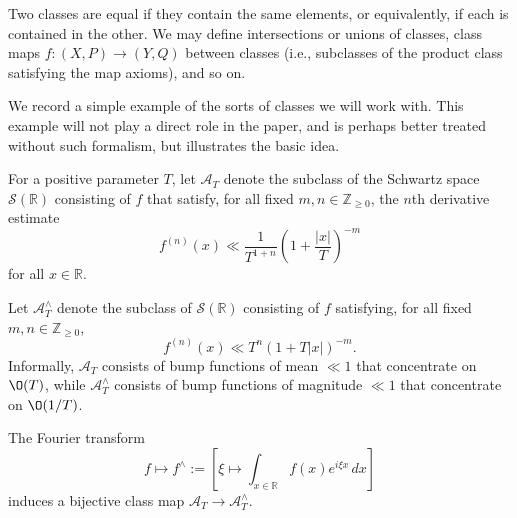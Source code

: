 Two classes are equal if they contain the same elements, or equivalently, if each is contained in the other.  We may define intersections or unions of classes, class maps $f : (X,P) \rightarrow (Y,Q)$ between classes (i.e., subclasses of the product class satisfying the map axioms), and so on.

We record a simple example of the sorts of classes we will work with.  This example will not play a direct role in the paper, and is perhaps better treated without such formalism, but illustrates the basic idea.
\begin{example}\label{exa:positive-parameter-t-scaling}
  For a positive parameter $T$, let $\mathcal{A}_T$ denote the subclass of the Schwartz space $\mathcal{S}(\mathbb{R})$ consisting of $f$ that satisfy, for all fixed $m,n \in \mathbb{Z}_{\geq 0}$, the $n$th derivative estimate
  \begin{equation*}
    f^{(n)}(x) \ll \frac{1}{T^{1+n}} \left(1 + \frac{|x|}{T}\right)^{-m}
  \end{equation*}
  for all $x \in \mathbb{R}$.

  Let $\mathcal{A}_T^\wedge$ denote the subclass of $\mathcal{S}(\mathbb{R})$ consisting of $f$ satisfying, for all fixed $m,n \in \mathbb{Z}_{\geq 0}$,
  \begin{equation*}
    f^{(n)}(x) \ll T^{n} \left( 1 + T |x| \right)^{-m}.
  \end{equation*}
  Informally, $\mathcal{A}_T$ consists of bump functions of mean $\ll 1$ that concentrate on $\O(T)$, while $\mathcal{A}_T^\wedge$ consists of bump functions of magnitude $\ll 1$ that concentrate on $\O(1/T)$.
\end{example}
\begin{lemma}\label{lem:four-transf-begin}
  The Fourier transform
  \begin{equation*}
    f \mapsto f^\wedge := [\xi \mapsto \int_{x \in \mathbb{R} } f(x) e^{i \xi x} \, d x]
  \end{equation*}
  induces a bijective class map $\mathcal{A}_T \rightarrow \mathcal{A}_T^\wedge$.
\end{lemma}
